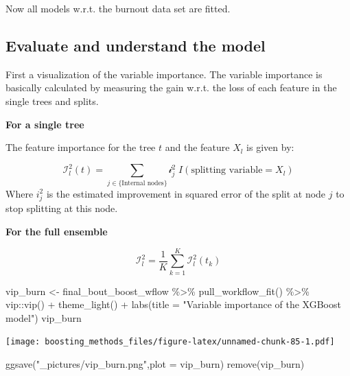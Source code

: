 \documentclass[
]{book}
\newenvironment{Shaded}{\begin{snugshade}}{\end{snugshade}}
\newcommand{\AttributeTok}[1]{\textcolor[rgb]{0.77,0.63,0.00}{#1}}
\newcommand{\FunctionTok}[1]{\textcolor[rgb]{0.00,0.00,0.00}{#1}}
\newcommand{\NormalTok}[1]{#1}
\newcommand{\OtherTok}[1]{\textcolor[rgb]{0.56,0.35,0.01}{#1}}
\newcommand{\SpecialCharTok}[1]{\textcolor[rgb]{0.00,0.00,0.00}{#1}}
\newcommand{\StringTok}[1]{\textcolor[rgb]{0.31,0.60,0.02}{#1}}
\begin{document}
Now all models w.r.t. the burnout data set are fitted.

\hypertarget{evaluate-and-understand-the-model}{%
\subsection{Evaluate and understand the model}\label{evaluate-and-understand-the-model}}

First a visualization of the variable importance. The variable importance is basically calculated by measuring the gain w.r.t. the loss of each feature in the single trees and splits.\citep{elements}

\textbf{For a single tree}

The feature importance for the tree \(t\) and the feature \(X_l\) is given by:

\[
\mathcal{I}_l^2(t) = \sum_{j \in \{\text{Internal nodes}\}} \mathcal{i}_j^2\; I(\text{splitting variable}=X_l)
\]
Where \(i_j^2\) is the estimated improvement in squared error of the split at node \(j\) to stop splitting at this node.

\textbf{For the full ensemble}

\[
\mathcal{I}_l^2 = \frac{1}{K} \sum_{k = 1}^K \mathcal{I}_l^2(t_k)
\]

\begin{Shaded}
\begin{Highlighting}[]
\NormalTok{vip\_burn }\OtherTok{\textless{}{-}}\NormalTok{ final\_bout\_boost\_wflow }\SpecialCharTok{\%\textgreater{}\%}
  \FunctionTok{pull\_workflow\_fit}\NormalTok{() }\SpecialCharTok{\%\textgreater{}\%}
\NormalTok{  vip}\SpecialCharTok{::}\FunctionTok{vip}\NormalTok{() }\SpecialCharTok{+} 
  \FunctionTok{theme\_light}\NormalTok{() }\SpecialCharTok{+}
  \FunctionTok{labs}\NormalTok{(}\AttributeTok{title =} \StringTok{"Variable importance of the XGBoost model"}\NormalTok{)}
\NormalTok{vip\_burn}
\end{Highlighting}
\end{Shaded}

\texttt{[image: boosting\_methods\_files/figure-latex/unnamed-chunk-85-1.pdf]}

\begin{Shaded}
\begin{Highlighting}[]
\FunctionTok{ggsave}\NormalTok{(}\StringTok{"\_pictures/vip\_burn.png"}\NormalTok{,}\AttributeTok{plot =}\NormalTok{ vip\_burn)}
\FunctionTok{remove}\NormalTok{(vip\_burn)}
\end{Highlighting}
\end{Shaded}
\end{document}
